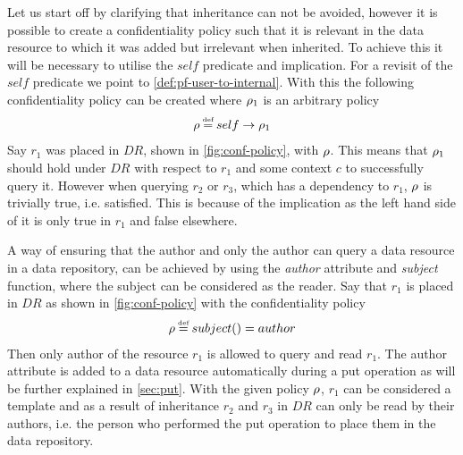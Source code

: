 \begin{example}\label{ex:avoid}
Let us start off by clarifying that inheritance can not be avoided, however it is possible to create a confidentiality policy such that it is relevant in the data resource to which it was added but irrelevant when inherited. To achieve this it will be necessary to utilise the $self$ predicate and implication. For a revisit of the $self$ predicate we point to \autoref{def:pf-user-to-internal}. With this the following confidentiality policy can be created where $\rho_1$ is an arbitrary policy 
\begin{align*}
    \conf \eqdef self \imply \conf_1
\end{align*}
Say $r_1$ was placed in $DR$, shown in \autoref{fig:conf-policy}, with $\rho$. This means that $\rho_1$ should hold under $DR$ with respect to $r_1$ and some context $c$ to successfully query it. However when querying $r_2$ or $r_3$, which has a dependency to $r_1$, $\rho$ is trivially true, i.e. satisfied. This is because of the implication as the left hand side of it is only true in $r_1$ and false elsewhere.
\end{example}

\begin{example}\label{ex:conf-reader-author}
A way of ensuring that the author and only the author can query a data resource in a data repository, can be achieved by using the \emph{author} attribute and \emph{subject} function, where the subject can be considered as the reader. Say that $r_1$ is placed in $DR$ as shown in \autoref{fig:conf-policy} with the confidentiality policy 
\begin{align*}
    \conf \eqdef subject() = author
\end{align*}
Then only author of the resource $r_1$ is allowed to query and read $r_1$. The author attribute is added to a data resource automatically during a put operation as will be further explained in \autoref{sec:put}. With the given policy $\rho$, $r_1$ can be considered a template and as a result of inheritance $r_2$ and $r_3$ in $DR$ can only be read by their authors, i.e. the person who performed the put operation to place them in the data repository.
\end{example}

